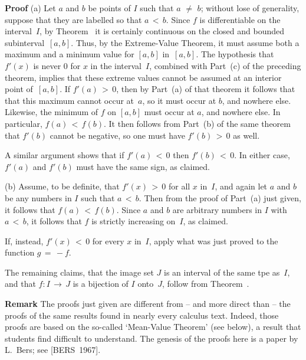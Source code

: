         {\bf Proof} (a) Let $a$ and $b$ be points of $I$ such that $a \,\,{\neq}\,\, b$;
    without lose of generality, suppose that they are labelled so that $a\,<\,b$.
    Since $f$ is differentiable on the interval~$I$, by Theorem~ it is certainly continuous on the closed and bounded subinterval~$[a,b]$.
    Thus, by the Extreme-Value Theorem, it must assume both a maximum and a minimum value for $[a,b]$ in~$[a,b]$.
    The hypothesis that $f'(x)$ is never $0$ for $x$ in the interval~$I$, combined with Part~(c) of the preceding theorem, implies that these extreme values cannot be assumed at an interior point of~$[a,b]$.
    If $f'(a)\,>\,0$, then by Part~(a) of that theorem it follows that that this maximum cannot occur at~$a$, so it must occur at $b$, and nowhere else.
    Likewise, the minimum of $f$ on $[a,b]$ must occur at $a$, and nowhere else. In particular, $f(a)\,<\,f(b)$.
    It then follows from Part~(b) of the same theorem that $f'(b)$ cannot be negative, so one must have $f'(b)\,>\,0$ as well.

        A similar argument shows that if $f'(a)\,<\,0$ then $f'(b)\,<\,0$. In either case, $f'(a)$ and $f'(b)$ must have the same sign, as claimed.

\V

        (b) Assume, to be definite, that $f'(x)\,>\,0$ for all $x$ in~$I$, and again let $a$ and $b$ be any numbers in $I$ such that $a\,<\,b$.
    Then from the proof of Part~(a) just given, it follows that $f(a)\,<\,f(b)$. Since $a$ and $b$ are arbitrary numbers in $I$ with $a\,<\,b$, it follows that $f$ is strictly increasing on~$I$, as claimed.

        If, instead, $f'(x)\,<\,0$ for every $x$ in~$I$, apply what was just proved to the function $g \,=\, -f$.

        The remaining claims, that the image set $J$ is an interval of the same tpe as~$I$,
    and that $f:I \,{\rightarrow}\, J$ is a bijection of $I$ onto~$J$, follow from Theorem~.

\V

        {\bf Remark} The proofs just given are different from -- and more direct than -- the proofs of the same results found in nearly every calculus text.
    Indeed, those proofs are based on the so-called `Mean-Value Theorem' (see below), a result that students find difficult to understand. The genesis of the proofs here is a paper by L.~Bers; see [BERS~1967].

\VV

